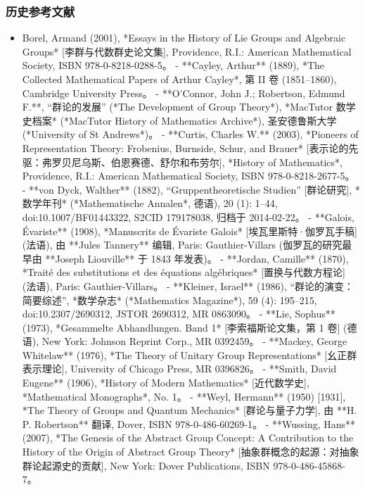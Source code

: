 \subsubsection{历史参考文献}  
\begin{itemize}
\item Borel, Armand (2001), *Essays in the History of Lie Groups and Algebraic Groups* [李群与代数群史论文集], Providence, R.I.: American Mathematical Society, ISBN 978-0-8218-0288-5。  
- **Cayley, Arthur** (1889), *The Collected Mathematical Papers of Arthur Cayley*, 第 II 卷 (1851–1860), Cambridge University Press。  
- **O'Connor, John J.; Robertson, Edmund F.**, “群论的发展” (*The Development of Group Theory*), *MacTutor 数学史档案* (*MacTutor History of Mathematics Archive*), 圣安德鲁斯大学 (*University of St Andrews*)。  
- **Curtis, Charles W.** (2003), *Pioneers of Representation Theory: Frobenius, Burnside, Schur, and Brauer* [表示论的先驱：弗罗贝尼乌斯、伯恩赛德、舒尔和布劳尔], *History of Mathematics*, Providence, R.I.: American Mathematical Society, ISBN 978-0-8218-2677-5。  
- **von Dyck, Walther** (1882), “Gruppentheoretische Studien” [群论研究], *数学年刊* (*Mathematische Annalen*, 德语), 20 (1): 1–44, doi:10.1007/BF01443322, S2CID 179178038, 归档于 2014-02-22。  
- **Galois, Évariste** (1908), *Manuscrits de Évariste Galois* [埃瓦里斯特·伽罗瓦手稿] (法语), 由 **Jules Tannery** 编辑, Paris: Gauthier-Villars (伽罗瓦的研究最早由 **Joseph Liouville** 于 1843 年发表)。  
- **Jordan, Camille** (1870), *Traité des substitutions et des équations algébriques* [置换与代数方程论] (法语), Paris: Gauthier-Villars。  
- **Kleiner, Israel** (1986), “群论的演变：简要综述”, *数学杂志* (*Mathematics Magazine*), 59 (4): 195–215, doi:10.2307/2690312, JSTOR 2690312, MR 0863090。  
- **Lie, Sophus** (1973), *Gesammelte Abhandlungen. Band 1* [李索福斯论文集，第 1 卷] (德语), New York: Johnson Reprint Corp., MR 0392459。  
- **Mackey, George Whitelaw** (1976), *The Theory of Unitary Group Representations* [幺正群表示理论], University of Chicago Press, MR 0396826。  
- **Smith, David Eugene** (1906), *History of Modern Mathematics* [近代数学史], *Mathematical Monographs*, No. 1。  
- **Weyl, Hermann** (1950) [1931], *The Theory of Groups and Quantum Mechanics* [群论与量子力学], 由 **H. P. Robertson** 翻译, Dover, ISBN 978-0-486-60269-1。  
- **Wussing, Hans** (2007), *The Genesis of the Abstract Group Concept: A Contribution to the History of the Origin of Abstract Group Theory* [抽象群概念的起源：对抽象群论起源史的贡献], New York: Dover Publications, ISBN 978-0-486-45868-7。  
\end{itemize}